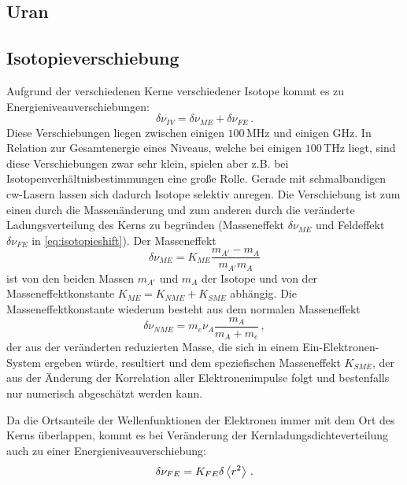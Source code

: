\subsection{Uran}\label{subsec:uran}

\subsection{Isotopieverschiebung}\label{subsec:isotopieverschiebung}
Aufgrund der verschiedenen Kerne verschiedener Isotope kommt es zu
Energieniveauverschiebungen:
\begin{equation}\label{eq:isotopieshift}
	\delta\nu_{IV}=\delta\nu_{ME}+\delta\nu_{FE}\,.
\end{equation}
Diese Verschiebungen liegen zwischen einigen $100\,$MHz und einigen GHz. In
Relation zur Gesamtenergie eines Niveaus, welche bei einigen $100\,$THz liegt,
sind diese Verschiebungen zwar sehr klein, spielen aber z.B. bei
Isotopenverhältnisbestimmungen eine große Rolle. Gerade mit schmalbandigen
cw-Lasern lassen sich dadurch Isotope selektiv anregen. Die Verschiebung ist zum
einen durch die Massenänderung und zum anderen durch die veränderte Ladungsverteilung des Kerns zu begründen (Masseneffekt $\delta\nu_{ME}$ und Feldeffekt $\delta\nu_{FE}$ in \eqref{eq:isotopieshift}). Der Masseneffekt
\begin{equation}\label{eq:masseneffekt}
	\delta\nu_{ME}=K_{ME}\frac{m_{A'}-m_A}{m_{A'}m_A}
\end{equation}
ist von den beiden Massen $m_{A'}$ und $m_A$ der Isotope und von der
Masseneffektkonstante $K_{ME}=K_{NME}+K_{SME}$ abhängig. Die
Masseneffektkonstante wiederum besteht aus dem normalen Masseneffekt
\begin{equation}\label{eq:normaler_masseneffekt}
	\delta\nu_{NME}=m_e\nu_A\frac{m_A}{m_A+m_e}\,,
\end{equation}
der aus der veränderten reduzierten Masse, die sich in einem
Ein-Elektronen-System ergeben würde, resultiert und dem speziefischen
Masseneffekt $K_{SME}$, der aus der Änderung der Korrelation aller
Elektronenimpulse folgt und bestenfalls nur numerisch abgeschätzt werden
kann. \par Da die Ortsanteile der Wellenfunktionen der Elektronen immer mit dem Ort des
Kerns überlappen, kommt es bei Veränderung der Kernladungsdichteverteilung auch
zu einer Energieniveauverschiebung:
\begin{equation}\label{eq:normaler_masseneffekt}
	\delta\nu_{FE}=K_{FE}\delta\left\langle r^2\right\rangle\,.
\end{equation}
